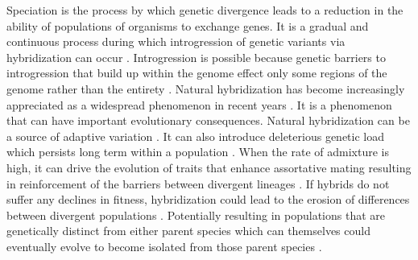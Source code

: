 

Speciation is the process by which genetic divergence leads to a reduction 
in the ability of populations of organisms to exchange genes.
It is a gradual and continuous process during which introgression of genetic  
variants via hybridization can occur \parencite{mallet2008,wu2001}.
Introgression is possible because genetic barriers to introgression that build up 
within the genome effect only some regions of the genome rather than the entirety 
\parencite{wu2001,gompert2012b}.
Natural hybridization has become increasingly appreciated as a widespread phenomenon 
in recent years \parencite{mallet2005,moran2021}.
It is a phenomenon that can have important evolutionary consequences.
Natural hybridization can be a source of adaptive variation \parencite{hedrick2013}. 
It can also introduce deleterious genetic load which persists long term 
within a population \parencite{moran2021}. 
When the rate of admixture is high, it can drive the evolution of traits  
that enhance assortative mating resulting in reinforcement of the barriers between 
divergent lineages \parencite{servedio2003}.
If hybrids do not suffer any declines in fitness, hybridization could lead to 
the erosion of differences between divergent populations \parencite{taylor2006}.
Potentially resulting in populations that are genetically distinct from either 
parent species which can themselves could eventually evolve to become isolated from those
parent species \parencite{moran2021}.

